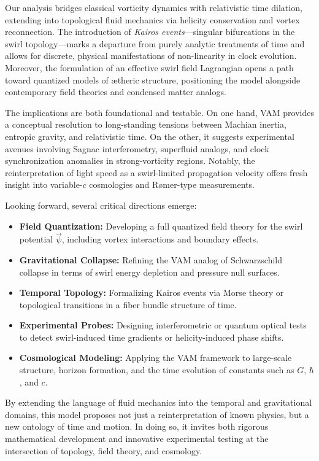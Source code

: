 \documentclass[a4paper,12pt]{article}
\begin{document}
    Our analysis bridges classical vorticity dynamics with relativistic time dilation, extending into topological fluid mechanics via helicity conservation and vortex reconnection. The introduction of \emph{Kairos events}—singular bifurcations in the swirl topology—marks a departure from purely analytic treatments of time and allows for discrete, physical manifestations of non-linearity in clock evolution. Moreover, the formulation of an effective swirl field Lagrangian opens a path toward quantized models of ætheric structure, positioning the model alongside contemporary field theories and condensed matter analogs.

    The implications are both foundational and testable. On one hand, VAM provides a conceptual resolution to long-standing tensions between Machian inertia, entropic gravity, and relativistic time. On the other, it suggests experimental avenues involving Sagnac interferometry, superfluid analogs, and clock synchronization anomalies in strong-vorticity regions. Notably, the reinterpretation of light speed as a swirl-limited propagation velocity offers fresh insight into variable-\( c \) cosmologies and Rømer-type measurements.

    Looking forward, several critical directions emerge:

    \begin{itemize}
        \item \textbf{Field Quantization:} Developing a full quantized field theory for the swirl potential \( \vec{\psi} \), including vortex interactions and boundary effects.
        \item \textbf{Gravitational Collapse:} Refining the VAM analog of Schwarzschild collapse in terms of swirl energy depletion and pressure null surfaces.
        \item \textbf{Temporal Topology:} Formalizing Kairos events via Morse theory or topological transitions in a fiber bundle structure of time.
        \item \textbf{Experimental Probes:} Designing interferometric or quantum optical tests to detect swirl-induced time gradients or helicity-induced phase shifts.
        \item \textbf{Cosmological Modeling:} Applying the VAM framework to large-scale structure, horizon formation, and the time evolution of constants such as \( G \), \( \hbar \), and \( c \).
    \end{itemize}

    By extending the language of fluid mechanics into the temporal and gravitational domains, this model proposes not just a reinterpretation of known physics, but a new ontology of time and motion. In doing so, it invites both rigorous mathematical development and innovative experimental testing at the intersection of topology, field theory, and cosmology.
\end{document}
